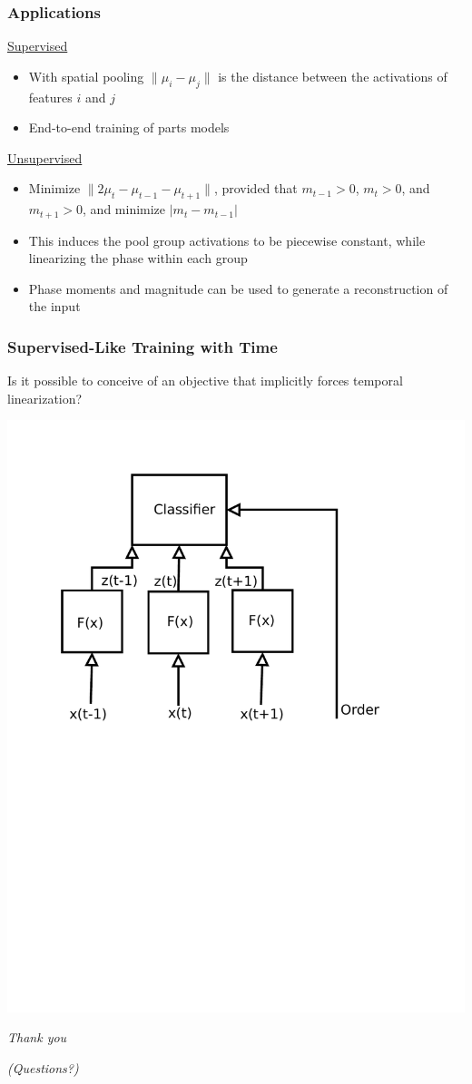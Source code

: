 \documentclass{beamer}
\begin{document}
\begin{frame} 
\frametitle{Applications}
\underline{Supervised}  
\begin{itemize} 
\item With spatial pooling $\| \mu_i - \mu_j \|$ is the distance between the activations of features $i$ and $j$  
\item End-to-end training of parts models
\end{itemize} 
\underline{Unsupervised}  
\begin{itemize} 
\item Minimize $\|2\mu_t-\mu_{t-1}-\mu_{t+1}\|$, provided that $m_{t-1}>0$, $m_t>0$, and $m_{t+1}>0$, and minimize $|m_{t}-m_{t-1}|$
\item This induces the pool group activations to be piecewise constant, while linearizing the phase within each group
\item Phase moments and magnitude can be used to generate a reconstruction of the input
\end{itemize} 
\end{frame} 

\begin{frame} 
\frametitle{Supervised-Like Training with Time}
Is it possible to conceive of an objective that implicitly forces temporal linearization? 
\centerline{\includegraphics[scale=0.4]{./images/NewStuff/frame_order.pdf}}
\end{frame} 

\begin{frame}
\centerline{
\huge
\emph{Thank you}} 
\centerline{
\emph{(Questions?)}}
\vspace{10 mm} 
\end{frame}
\end{document}
